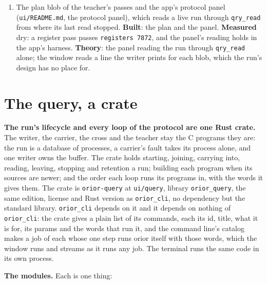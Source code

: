\begin{enumerate}
\item The plan blob of the teacher's passes and the app's protocol panel (\texttt{ui/\allowbreak{}README.\allowbreak{}md}, the protocol panel), which reads a live run through \texttt{qry\_\allowbreak{}read} from where its last read stopped. \textbf{Built}: the plan and the panel. \textbf{Measured} dry: a register pass passes \texttt{registers 7872}, and the panel's reading holds in the app's harness. \textbf{Theory}: the panel reading the run through \texttt{qry\_\allowbreak{}read} alone; the window reads a line the writer prints for each blob, which the run's design has no place for.
\end{enumerate}

\section{\texorpdfstring{The query, a crate}{The query, a crate}}

\textbf{The run's lifecycle and every loop of the protocol are one Rust crate.} The writer, the carrier, the cross and the teacher stay the C programs they are: the run is a database of processes, a carrier's fault takes its process alone, and one writer owns the buffer. The crate holds starting, joining, carrying into, reading, leaving, stopping and retention a run; building each program when its sources are newer; and the order each loop runs its programs in, with the words it gives them. The crate is \texttt{orior-\allowbreak{}query} at \texttt{ui/\allowbreak{}query}, library \texttt{orior\_\allowbreak{}query}, the same edition, license and Rust version as \texttt{orior\_\allowbreak{}cli}, no dependency but the standard library. \texttt{orior\_\allowbreak{}cli} depends on it and it depends on nothing of \texttt{orior\_\allowbreak{}cli}: the crate gives a plain list of its commands, each its id, title, what it is for, its params and the words that run it, and the command line's catalog makes a job of each whose one step runs orior itself with those words, which the window runs and streams as it runs any job. The terminal runs the same code in its own process.

\textbf{The modules.} Each is one thing:

